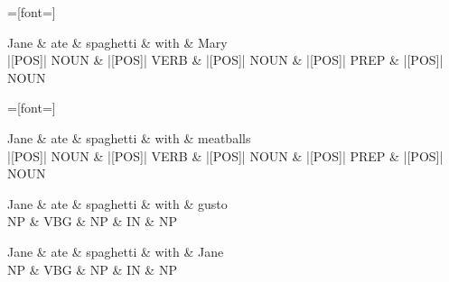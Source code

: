 \documentclass{article}
\begin{document}
    \begin{dependency}[theme=simple]
        =[font=\tiny]%
        \begin{deptext}
			Jane \& ate \& spaghetti \& with \& Mary \\
            |[POS]| NOUN \& |[POS]| VERB \& |[POS]| NOUN \& |[POS]| PREP \& |[POS]| NOUN \\
        \end{deptext}
    \end{dependency}

    \begin{dependency}[theme=simple]
        =[font=\tiny]%
        \begin{deptext}
			Jane \& ate \& spaghetti \& with \& meatballs \\
            |[POS]| NOUN \& |[POS]| VERB \& |[POS]| NOUN \& |[POS]| PREP \& |[POS]| NOUN \\
        \end{deptext}
    \end{dependency}

    \begin{dependency}
        \begin{deptext}
			Jane \& ate \& spaghetti \& with \& gusto \\
            NP \& VBG \& NP \& IN \& NP \\
        \end{deptext}
    \end{dependency}
    
    \begin{dependency}
        \begin{deptext}
			Jane \& ate \& spaghetti \& with \& Jane \\
            NP \& VBG \& NP \& IN \& NP \\
        \end{deptext}
    \end{dependency}
    
\end{document}
